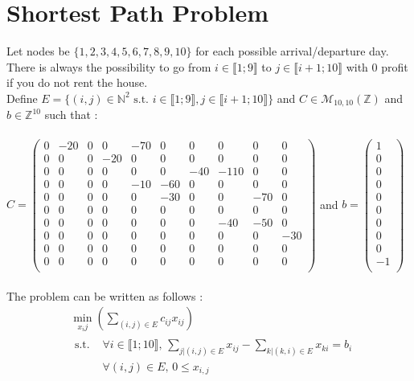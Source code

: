 \documentclass{article}
\begin{document}
\section*{Shortest Path Problem}
Let nodes be $\{1,2,3,4,5,6,7,8,9,10\}$ for each possible arrival/departure day. There is always the possibility  to go from $i \in \llbracket 1;9\rrbracket $ to $j \in \llbracket i+1;10\rrbracket$ with 0 profit if you do not rent the house.
\\
Define $E = \{(i,j)\in\mathbb{N}^2\text{ s.t. } i\in\llbracket 1;9\rrbracket, j\in\llbracket i+1;10\rrbracket\}$ and $C\in\mathcal{M}_{10,10}(\mathbb{Z})$ and $b\in \mathbb{Z}^{10}$ such that : 
\\\\
$C = \left(\begin{array}{cccccccccc}
    0 & -20 & 0 & 0 & -70 & 0   &   0 & 0      & 0   & 0 \\
    0 & 0 & 0 & -20 & 0   & 0   &   0 & 0      & 0   & 0 \\
    0 & 0 & 0 & 0   & 0   & 0   & -40 & -110   & 0   & 0 \\
    0 & 0 & 0 & 0   & -10 & -60 &   0 & 0      & 0   & 0 \\
    0 & 0 & 0 & 0   &   0 & -30 &   0 & 0      & -70 & 0 \\
    0 & 0 & 0 & 0   &   0 &   0 &   0 & 0      & 0   & 0 \\
    0 & 0 & 0 & 0   &   0 &   0 &   0 & -40    & -50 & 0 \\
    0 & 0 & 0 & 0   &   0 &   0 &   0 & 0      & 0 & -30 \\
    0 & 0 & 0 & 0   &   0 &   0 &   0 & 0      & 0 &   0 \\
    0 & 0 & 0 & 0   &   0 &   0 &   0 & 0      & 0 &   0 \\
\end{array}\right)$ and $b = \left(\begin{array}{c}
    1\\
    0\\
    0\\
    0\\
    0\\
    0\\
    0\\
    0\\
    0\\
    -1\\
\end{array}\right)$
\\\\
The problem can be written as follows : $$\boxed{\begin{split}
    & \min\limits_{x_ij}\left(\sum\limits_{(i,j)\in E}c_{ij}x_{ij}\right)\\
    &\begin{split}
        \text{s.t. } & \forall i \in \llbracket 1;10\rrbracket\text{, }\sum\limits_{j|(i,j)\in E} x_{ij} - \sum\limits_{k|(k,i)\in E} x_{ki} = b_i\\
        & \forall (i,j)\in E\text{, } 0\leq x_{i,j}
    \end{split}\\
\end{split}}$$
\end{document}
